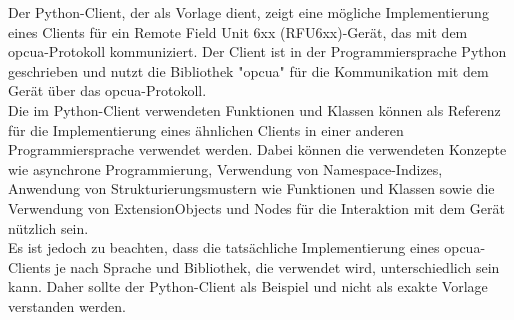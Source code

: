 Der Python-Client, der als Vorlage dient, zeigt eine mögliche Implementierung eines Clients für ein Remote Field Unit 6xx (RFU6xx)-Gerät, das mit dem \ac{opcua}-Protokoll kommuniziert. Der Client ist in der Programmiersprache Python geschrieben und nutzt die Bibliothek "opcua" für die Kommunikation mit dem Gerät über das \ac{opcua}-Protokoll.\\

Die im Python-Client verwendeten Funktionen und Klassen können als Referenz für die Implementierung eines ähnlichen Clients in einer anderen Programmiersprache verwendet werden. Dabei können die verwendeten Konzepte wie asynchrone Programmierung, Verwendung von Namespace-Indizes, Anwendung von Strukturierungsmustern wie Funktionen und Klassen sowie die Verwendung von ExtensionObjects und Nodes für die Interaktion mit dem Gerät nützlich sein.\\

Es ist jedoch zu beachten, dass die tatsächliche Implementierung eines \ac{opcua}-Clients je nach Sprache und Bibliothek, die verwendet wird, unterschiedlich sein kann. Daher sollte der Python-Client als Beispiel und nicht als exakte Vorlage verstanden werden.\\






